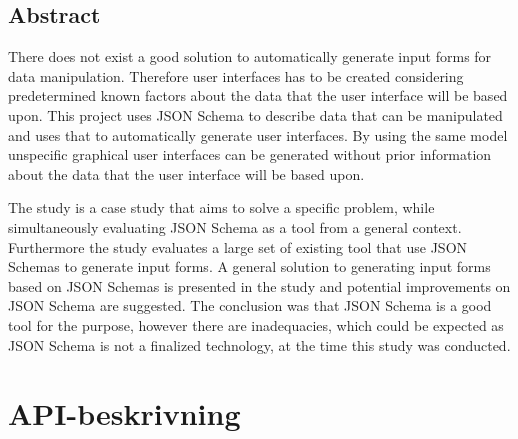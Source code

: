 \documentclass[10pt,a4paper,titlepage,twoside]{report}
\begin{document}
\section*{Abstract}
There does not exist a good solution to automatically generate input forms for data manipulation. Therefore user interfaces has to be created considering predetermined known factors about the data that the user interface will be based upon. This project uses JSON Schema to describe data that can be manipulated and uses that to automatically generate user interfaces. By using the same model unspecific graphical user interfaces can be generated without prior information about the data that the user interface will be based upon.

The study is a case study that aims to solve a specific problem, while simultaneously evaluating JSON Schema as a tool from a general context. Furthermore the study evaluates a large set of existing tool that use JSON Schemas to generate input forms. A general solution to generating input forms based on JSON Schemas is presented in the study and potential improvements on JSON Schema are suggested. The conclusion was that JSON Schema is a good tool for the purpose, however there are inadequacies, which could be expected as JSON Schema is not a finalized technology, at the time this study was conducted.

\clearpage

\setlength{\parskip}{0pt}

\tableofcontents

\setlength{\parskip}{\baselineskip}


\mainmatter








\printbibliography[heading=bibintoc] %

\appendix

\chapter{API-beskrivning}
\label{appendix:api-beskrivning}
\end{document}
